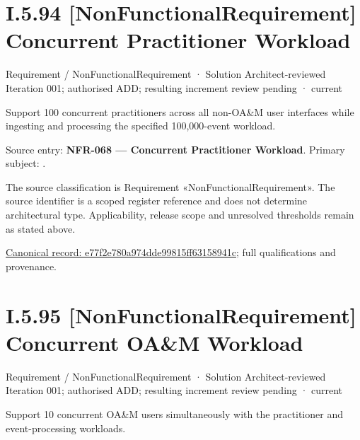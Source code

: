 \section*{I.5.94 [NonFunctionalRequirement] Concurrent Practitioner Workload}
\label{navigation:I.5.94}

\label{element:e77f2e780a974dde99815ff63158941c}
{\small Requirement / NonFunctionalRequirement · Solution Architect-reviewed Iteration 001; authorised ADD; resulting increment review pending · current}\par

Support 100 concurrent practitioners across all non-OA\&M user interfaces while ingesting and processing the specified 100,000-event workload.



Source entry: \textbf{NFR-068 — Concurrent Practitioner Workload}. Primary subject: \texttt{}.



The source classification is Requirement «NonFunctionalRequirement». The source identifier is a scoped register reference and does not determine architectural type. Applicability, release scope and unresolved thresholds remain as stated above.


{\footnotesize \href{../../../../continuum/motivation/requirement/non-functional-requirement/e77f2e780a974dde99815ff63158941c.md}{Canonical record: e77f2e780a974dde99815ff63158941c}; full qualifications and provenance.}\par
\section*{I.5.95 [NonFunctionalRequirement] Concurrent OA\&M Workload}
\label{navigation:I.5.95}

\label{element:5220295ae5d144468066ae70683e0f19}
{\small Requirement / NonFunctionalRequirement · Solution Architect-reviewed Iteration 001; authorised ADD; resulting increment review pending · current}\par

Support 10 concurrent OA\&M users simultaneously with the practitioner and event-processing workloads.



